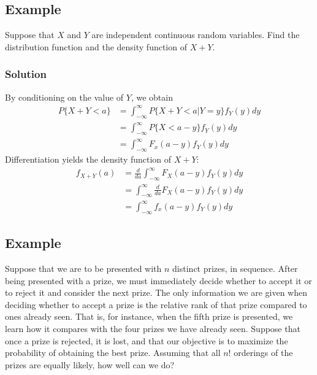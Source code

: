\subsection*{Example}
Suppose that $X$ and $Y$ are independent continuous random variables. Find the distribution function and the density function of $X + Y$.
\subsubsection*{Solution}
By conditioning on the value of $Y$, we obtain 
\begin{equation*}
    \begin{split}
        P\{X + Y < a\} &= \int^\infty_{-\infty} P\{X + Y < a | Y = y\}f_Y(y) dy\\
        &= \int^\infty_{-\infty} P\{X < a - y\}f_Y(y) dy\\
        &= \int^\infty_{-\infty} F_x(a - y)f_Y(y) dy
    \end{split}
\end{equation*}
Differentiation yields the density function of $X + Y$:
\begin{equation*}
    \begin{split}
        f_{X+Y}(a) &= \frac{d}{da}\int^\infty_{-\infty} F_X(a - y)f_Y(y) dy\\
        &= \int^\infty_{-\infty} \frac{d}{da} F_X (a - y)f_Y(y) dy\\
        &= \int^\infty_{-\infty} f_x(a - y)f_Y(y) dy
    \end{split}
\end{equation*}
\subsection*{Example}
Suppose that we are to be presented with $n$ distinct prizes, in sequence. After being presented with a prize, we must immediately decide whether to accept it or to reject it and consider the next prize. The only information we are given when
deciding whether to accept a prize is the relative rank of that prize compared to ones already seen. That is, for instance, when the fifth prize is presented, we learn how it compares with the four prizes we have already seen. Suppose that once a prize is rejected, it is lost, and that our objective is to maximize the probability of obtaining the best prize. Assuming that all $n!$ orderings of the prizes are equally likely, how well can we do?
